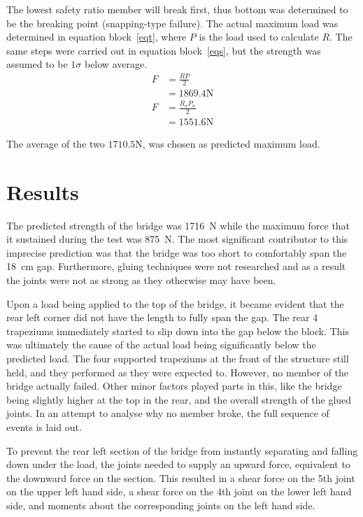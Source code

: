 \documentclass[12pt]{article}
\begin{document}
		The lowest safety ratio member will break first, thus bottom was determined to be the breaking point (snapping-type failure). The actual maximum load was determined in equation block~\ref{eqt}, where $P$ is the load used to calculate $R$. The same steps were carried out in equation block~\ref{eqs}, but the strength was assumed to be $1\sigma$ below average.
		\begin{subequations}
			\begin{align}
				F&=\frac{R P}{2} \\
				&=1869.4 \mathrm{N}
			\end{align}
			\label{eqt}
		\end{subequations}
		\begin{subequations}
			\begin{align}
				F&=\frac{R_{\sigma} P_{\sigma}}{2} \\
				&=1551.6 \mathrm{N}
			\end{align}
			\label{eqs}
		\end{subequations}

		The average of the two $1710.5\mathrm{N}$, was chosen as predicted maximum load.
	\section{Results}
The predicted strength of the bridge was 1716~N while the maximum force that it sustained during the test was 875~N. The most significant contributor to this imprecise prediction was that the bridge was too short to comfortably span the 18~cm gap. Furthermore, gluing techniques were not researched and as a result the joints were not as strong as they otherwise may have been.

Upon a load being applied to the top of the bridge, it became evident that the rear left corner did not have the length to fully span the gap. The rear 4 trapeziums immediately started to slip down into the gap below the block. This was ultimately the cause of the actual load being significantly below the predicted load. The four supported trapeziums at the front of the structure still held, and they performed as they were expected to. However, no member of the bridge actually failed. Other minor factors played parts in this, like the bridge being slightly higher at the top in the rear, and the overall strength of the glued joints. In an attempt to analyse why no member broke, the full sequence of events is laid out.

To prevent the rear left section of the bridge from instantly separating and falling down under the load, the joints needed to supply an upward force, equivalent to the downward force on the section. This resulted in a shear force on the 5th joint on the upper left hand side, a shear force on the 4th joint on the lower left hand side, and moments about the corresponding joints on the left hand side. 
\end{document}
